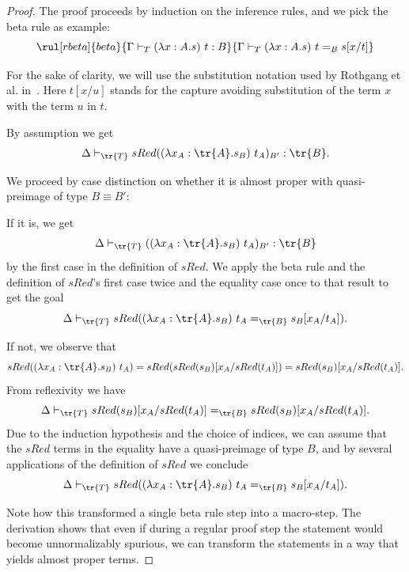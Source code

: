 \begin{proof}
 The proof proceeds by induction on the inference rules, and we pick the beta rule as
example: \[\rul[rbeta]{beta}{\Gamma \vdash_T (\lambda x:A.s)\ t:B}{\Gamma\vdash_T (\lambda x:A.s)\ t=_B s[x/t]}\]

For the sake of clarity, we will use the substitution notation used by Rothgang et
al. in~\cite{RRB23ext}. Here \(t[x/u]\) stands for the capture avoiding substitution of the
term \(x\) with the term \(u\) in \(t\).

By assumption we get \[\Delta \vdash_{\tr{T}} sRed((\lambda x_A:\tr{A}.s_B)\ t_A)_{B'}:\tr{B}.\]

We proceed by case distinction on whether it is almost proper with quasi-preimage of type \(B
\equiv B'\):

If it is, we get \[\Delta \vdash_{\tr{T}} ((\lambda x_A:\tr{A}.s_B)\ t_A)_{B'}:\tr{B}\] by
the first case in the definition of \(sRed\). We apply the beta rule and the definition
of \(sRed\)'s first case twice and the equality case once to that result to get the
goal \[\Delta \vdash_{\tr{T}} sRed ((\lambda x_A:\tr{A}.s_B)\ t_A =_{\tr{B}} s_B[x_A/t_A]).\]

If not, we observe that \[sRed((\lambda x_A:\tr{A}.s_B)\ t_A) = sRed(sRed(s_B)[x_A/sRed(t_A)]) =
sRed(s_B)[x_A/sRed(t_A)].\] From reflexivity we have \[\Delta \vdash_{\tr{T}}
sRed(s_B)[x_A/sRed(t_A)] =_{\tr{B}} sRed(s_B)[x_A/sRed(t_A)].\] Due to the induction hypothesis
and the choice of indices, we can assume that the \(sRed\) terms in the equality have a
quasi-preimage of type \(B\), and by several applications of the definition of \(sRed\) we
conclude \[\Delta \vdash_{\tr{T}} sRed ((\lambda x_A:\tr{A}.s_B)\ t_A =_{\tr{B}} s_B[x_A/t_A]).\]

Note how this transformed a single beta rule step into a macro-step. The derivation
shows that even if during a regular proof step the statement would become unnormalizably
spurious, we can transform the statements in a way that yields almost proper terms.
\end{proof}

